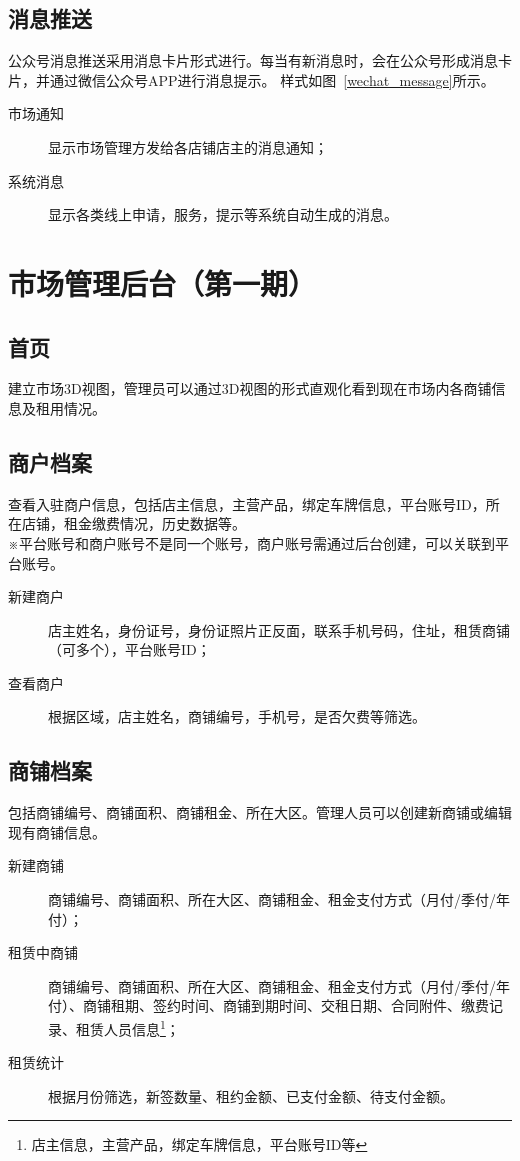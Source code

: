 \documentclass[12pt,a4paper,openany]{ctexrep}
\begin{document}
\section{消息推送}
\label{3.3}
公众号消息推送采用消息卡片形式进行。每当有新消息时，会在公众号形成消息卡片，并通过微信公众号APP进行消息提示。
样式如图~\ref{wechat_message}所示。

\begin{description}
\item[市场通知]显示市场管理方发给各店铺店主的消息通知；
\item[系统消息]显示各类线上申请，服务，提示等系统自动生成的消息。
\end{description}

\chapter{市场管理后台（第一期）}  
\section{首页}
建立市场3D视图，管理员可以通过3D视图的形式直观化看到现在市场内各商铺信息及租用情况。

\section{商户档案}
查看入驻商户信息，包括店主信息，主营产品，绑定车牌信息，平台账号ID，所在店铺，租金缴费情况，历史数据等。\\
※平台账号和商户账号不是同一个账号，商户账号需通过后台创建，可以关联到平台账号。
\begin{description}
\item[新建商户]店主姓名，身份证号，身份证照片正反面，联系手机号码，住址，租赁商铺（可多个），平台账号ID；
\item[查看商户]根据区域，店主姓名，商铺编号，手机号，是否欠费等筛选。
\end{description}

\section{商铺档案}
包括商铺编号、商铺面积、商铺租金、所在大区。管理人员可以创建新商铺或编辑现有商铺信息。
\begin{description}
\item[新建商铺]商铺编号、商铺面积、所在大区、商铺租金、租金支付方式（月付/季付/年付）；
\item[租赁中商铺]商铺编号、商铺面积、所在大区、商铺租金、租金支付方式（月付/季付/年付）、商铺租期、签约时间、商铺到期时间、交租日期、合同附件、缴费记录、租赁人员信息\footnote{店主信息，主营产品，绑定车牌信息，平台账号ID等}；
\item[租赁统计]根据月份筛选，新签数量、租约金额、已支付金额、待支付金额。
\end{description}
\end{document}
